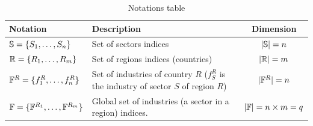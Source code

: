 \documentclass[main.tex]{subfiles}
\begin{document}
{\renewcommand{\arraystretch}{1.3}%

  \begin{table}[H]
    \centering
    \caption{Notations table}
    \begin{tabularx}{\linewidth}{
      p{4.5cm}Xc
      }
      \textbf{Notation} & \textbf{Description} & \textbf{Dimension} \\\toprule
      $\mathbb{S}{} = \{ S_1, \ldots, S_n\}$ & Set of sectors indices & $|\mathbb{S}| = n$ \\
      $\mathbb{R} = \{ R_1, \ldots, R_m\}$ & Set of regions indices (countries) & $|\mathbb{R}| = m$ \\
      $\rfirmsset = \{f^R_1, \ldots,  f^R_n\}$ & Set of industries of country $R$ ($f^R_{S}$ is the industry of sector $S$ of region $R$) & $|\rfirmsset{}| = n$\\
      $\firmsset = \{\rfirmsset[R_1], \ldots, \rfirmsset[R_{m}]\}$ & Global set
                                                                     of
                                                                     industries
                                                                     (a sector
                                                                     in a
                                                                     region)
                                                                     indices. &
                                                                                $|\mathbb{F}|
                                                                                =
                                                                                n
                                                                                \times
                                                                                m
                                                                                =
                                                                                q$\\

\end{tabularx}
\end{table}}
\end{document}
